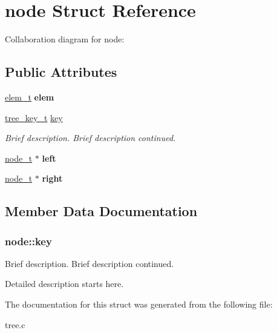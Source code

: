 \hypertarget{structnode}{}\section{node Struct Reference}
\label{structnode}


Collaboration diagram for node\+:
\subsection*{Public Attributes}
\begin{DoxyCompactItemize}
\item 
\hyperlink{unionelement}{elem\+\_\+t} {\bfseries elem}\hypertarget{structnode_a5f9ee8710ff865cda6ed144d91a32121}{}\label{structnode_a5f9ee8710ff865cda6ed144d91a32121}

\item 
\hyperlink{unionelement}{tree\+\_\+key\+\_\+t} \hyperlink{structnode_aa6b692707ee43532d0437efb6f060dfd}{key}
\begin{DoxyCompactList}\small\item\em Brief description. Brief description continued. \end{DoxyCompactList}\item 
\hyperlink{structnode}{node\+\_\+t} $\ast$ {\bfseries left}\hypertarget{structnode_aacd557e63e1f9dca9048ed58bb3dbb2c}{}\label{structnode_aacd557e63e1f9dca9048ed58bb3dbb2c}

\item 
\hyperlink{structnode}{node\+\_\+t} $\ast$ {\bfseries right}\hypertarget{structnode_a8ab67b704953f3699d566a1a5d6047ad}{}\label{structnode_a8ab67b704953f3699d566a1a5d6047ad}

\end{DoxyCompactItemize}


\subsection{Member Data Documentation}
\subsubsection[{\texorpdfstring{key}{key}}]{ node\+::key}\hypertarget{structnode_aa6b692707ee43532d0437efb6f060dfd}{}\label{structnode_aa6b692707ee43532d0437efb6f060dfd}


Brief description. Brief description continued. 

Detailed description starts here. 

The documentation for this struct was generated from the following file\+:\begin{DoxyCompactItemize}
\item 
tree.\+c\end{DoxyCompactItemize}
